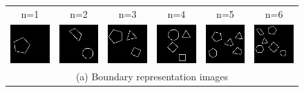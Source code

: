 \documentclass[letterpaper]{article} %
\begin{document}
\begin{figure}[!t]%
\centering
\footnotesize 
\begin{tabular}{cccccc}
\multicolumn{1}{c}{n=1} \hspace{-12pt} &  
\multicolumn{1}{c}{n=2} \hspace{-12pt} & 
\multicolumn{1}{c}{n=3} \hspace{-12pt} & 
\multicolumn{1}{c}{n=4} \hspace{-12pt} & 
\multicolumn{1}{c}{n=5} \hspace{-12pt} & 
\multicolumn{1}{c}{n=6} \\

\multicolumn{1}{c}{\includegraphics[width=0.125\columnwidth]{images/edges_1.png}} \hspace{-12pt} &  \multicolumn{1}{c}{\includegraphics[width=0.125\columnwidth]{images/edges_2.png}} \hspace{-12pt} & \multicolumn{1}{c}{\includegraphics[width=0.125\columnwidth]{images/edges_3.png}} \hspace{-12pt} & \multicolumn{1}{c}{\includegraphics[width=0.125\columnwidth]{images/edges_4.png}} \hspace{-12pt} & \multicolumn{1}{c}{\includegraphics[width=0.125\columnwidth]{images/edges_5.png}} \hspace{-12pt} & \multicolumn{1}{c}{\includegraphics[width=0.125\columnwidth]{images/edges_6.png}} \\ 
\multicolumn{6}{c}{(a) Boundary representation images} \\


\end{tabular}
\end{figure}
\end{document}
